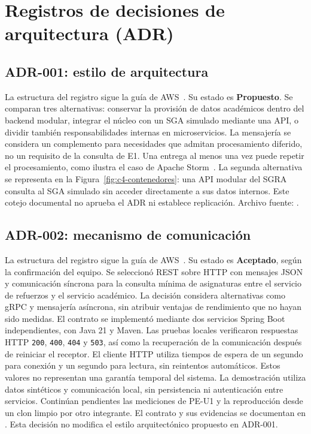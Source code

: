 \section{Registros de decisiones de arquitectura (ADR)}
\subsection{ADR-001: estilo de arquitectura}
La estructura del registro sigue la guía de AWS~\cite{aws-adr}. Su estado es \textbf{Propuesto}. Se comparan tres alternativas: conservar la provisión de datos académicos dentro del backend modular, integrar el núcleo con un SGA simulado mediante una API, o dividir también responsabilidades internas en microservicios. La mensajería se considera un complemento para necesidades que admitan procesamiento diferido, no un requisito de la consulta de E1. Una entrega al menos una vez puede repetir el procesamiento, como ilustra el caso de Apache Storm~\cite{bonte2025-stream}. La segunda alternativa se representa en la Figura~\ref{fig:c4-contenedores}: una API modular del SGRA consulta al SGA simulado sin acceder directamente a sus datos internos. Este cotejo documental no aprueba el ADR ni establece replicación. Archivo fuente: .
\subsection{ADR-002: mecanismo de comunicación}
La estructura del registro sigue la guía de AWS~\cite{aws-adr}. Su estado es \textbf{Aceptado}, según la confirmación del equipo. Se seleccionó REST sobre HTTP con mensajes JSON y comunicación síncrona para la consulta mínima de asignaturas entre el servicio de refuerzos y el servicio académico.
La decisión considera alternativas como gRPC y mensajería asíncrona, sin atribuir ventajas de rendimiento que no hayan sido medidas.
El contrato se implementó mediante dos servicios Spring Boot independientes, con Java 21 y Maven. Las pruebas locales verificaron respuestas HTTP \texttt{200}, \texttt{400}, \texttt{404} y \texttt{503}, así como la recuperación de la comunicación después de reiniciar el receptor.
El cliente HTTP utiliza tiempos de espera de un segundo para conexión y un segundo para lectura, sin reintentos automáticos. Estos valores no representan una garantía temporal del sistema.
La demostración utiliza datos sintéticos y comunicación local, sin persistencia ni autenticación entre servicios. Continúan pendientes las mediciones de PE-U1 y la reproducción desde un clon limpio por otro integrante.
El contrato y sus evidencias se documentan en . Esta decisión no modifica el estilo arquitectónico propuesto en ADR-001.
